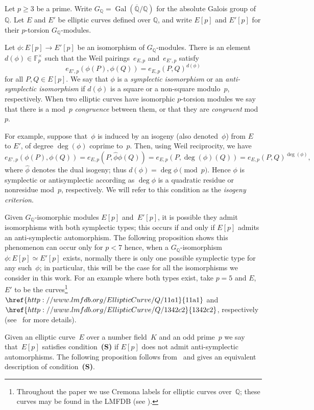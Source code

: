 \documentclass[12pt, reqno]{amsart}
\newcommand{\lmfdbec}[3]{\href{http://www.lmfdb.org/EllipticCurve/Q/#1#2#3}{{\text{\rm#1#2#3}}}}
\newcommand{\F}{\mathbb{F}}
\newcommand{\Q}{\mathbb{Q}}
\newcommand{\Qbar}{{\overline{\Q}}}
\DeclareMathOperator{\Gal}{Gal}
\numberwithin{equation}{section}
\theoremstyle{definition}
\theoremstyle{remark}
\begin{document}
Let $p \geq 3$ be a prime. Write $G_\Q = \Gal(\Qbar/\Q)$ for the
absolute Galois group of $\Q$.  Let $E$ and $E'$ be elliptic curves defined over $\Q$, and write $E[p]$ and $E'[p]$ for their $p$-torsion $G_\Q$-modules.

Let $\phi : E[p] \to E'[p]$ be an isomorphism of $G_\Q$-modules.
There is an element $d(\phi) \in \F_p^\times$ such that the Weil 
pairings~$e_{E,p}$ and~$e_{E',p}$ satisfy
\[
e_{E',p}(\phi(P), \phi(Q)) = e_{E,p}(P, Q)^{d(\phi)}
\]
for all $P, Q \in E[p]$.  We say that $\phi$ is a {\em symplectic
  isomorphism} or an {\em anti-symplectic isomorphism} if $d(\phi)$ is
a square or a non-square modulo~$p$, respectively.  When two elliptic
curves have isomorphic $p$-torsion modules we say that there is a
mod~$p$ {\em congruence} between them, or that they are {\em
  congruent} mod~$p$.

For example, suppose that~$\phi$ is induced by an isogeny (also
denoted~$\phi$) from $E$ to $E'$, of degree $\deg(\phi)$ coprime
to~$p$. Then, using Weil reciprocity, 
we have 
\[
  e_{E',p}(\phi(P), \phi(Q)) = e_{E,p}(P, \hat\phi\phi(Q)) =
  e_{E,p}(P, \deg(\phi)(Q)) = e_{E,p}(P, Q)^{\deg(\phi)},
  \]
  where $\hat{\phi}$ denotes the dual isogeny; 
  thus $d(\phi)=\deg\phi\pmod{p}$.
  Hence $\phi$ is symplectic or antisymplectic according as $\deg\phi$
is a quadratic residue or nonresidue mod~$p$, respectively.  We will refer to
this condition as the \emph{isogeny criterion}.

Given $G_\Q$-isomorphic modules $E[p]$ and~$E'[p]$, it is possible
they admit isomorphisms with both symplectic types; this occurs if and only if $E[p]$ admits an anti-symplectic automorphism. 
The following proposition shows this phenomenon can occur only 
for $p < 7$ hence, when a $G_\Q$-isomorphism $\phi : E[p] \simeq E'[p]$ exists, normally there is only one possible symplectic type for any such~$\phi$; in particular, this will be the case for all the isomorphisms we consider in this work. 
For an example where both types exist, take $p=5$ and
$E$, $E'$ to be the curves\footnote{Throughout the paper we use
Cremona labels for elliptic curves over~$\Q$; these curves may be
found in the LMFDB (see \cite{lmfdb}).} $\lmfdbec{11}{a}{1}$ and
$\lmfdbec{1342}{c}{2}$, respectively (see~\cite[Example~5.2]{FKSym}
for more details).

Given an elliptic curve~$E$ over a number field~$K$ and an odd prime~$p$ we say 
that~$E[p]$ satisfies condition~{\bf (S)} if $E[p]$ does not admit anti-symplectic automorphisms. The following proposition follows from~\cite{FKSym} and gives an equivalent description of condition~{\bf (S)}.
\end{document}
